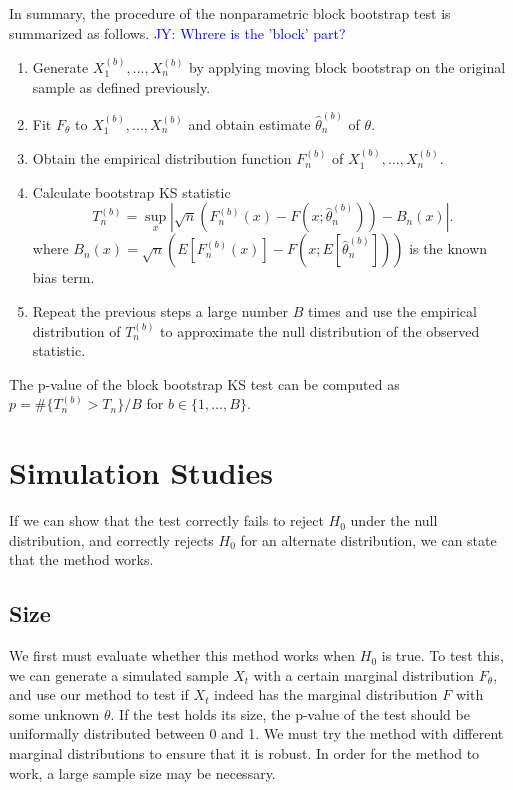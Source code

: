 \documentclass[12pt, titlepage, letterpaper]{article}
\newcommand{\jy}[1]{\textcolor{blue}{JY: #1}}
\begin{document}
{In summary, the procedure of the nonparametric block bootstrap test is 
summarized as follows.
\jy{Whrere is the 'block' part?}
\begin{enumerate}
\item
  Generate $X^{(b)}_1,...,X^{(b)}_n$ by applying moving block bootstrap 
  on the original sample as
  defined previously.
\item
  Fit $F_\theta$ to $X^{(b)}_1,...,X^{(b)}_n$ and obtain estimate 
	$\hat\theta^{(b)}_n$ of $\theta$.
\item
  Obtain the empirical distribution function $F^{(b)}_n$ of
  $X^{(b)}_1,...,X^{(b)}_n$. 
\item
  Calculate bootstrap KS statistic
  \[
    T^{(b)}_n = \sup_x | \sqrt{n}\left(F^{(b)}_n(x) 
    - F(x; \hat\theta^{(b)}_n)\right) - B_n(x) |.
  \]
  where 
  $B_{n}(x) = \sqrt{n}(E[F^{(b)}_n(x)] - 
  F(x; E[\hat\theta^{(b)}_n]))$ is the known
  bias term.
\item
  Repeat the previous steps a large number $B$ times and use the empirical
  distribution of $T^{(b)}_n$ to approximate the null distribution of the observed
  statistic. 
\end{enumerate}


The p-value of the block bootstrap KS test can be computed
as $p = \#\{T^{(b)}_n > T_n\} / B$ for 
$b \in \{1, \ldots, B\}$.

\section{Simulation Studies}
\label{sec:simu}

If we can show that the test correctly fails to reject $H_0$ under the null
distribution, and correctly rejects $H_0$ for an alternate distribution, we can
state that the method works.


\subsection{Size}
We first must evaluate whether this method works when $H_0$ is true. To
test this, we can
generate a simulated sample $X_t$ with a certain marginal distribution 
$F_\theta$,
and use our method to test if $X_t$ indeed has the marginal distribution $F$ 
with some unknown $\theta$. If the test holds its size, the 
p-value
of the test should be uniformally distributed between 0 and 1. We must try the
method with different marginal distributions to ensure that it is robust.
In order for the method to work, a large sample size may be necessary. 


}
\end{document}
